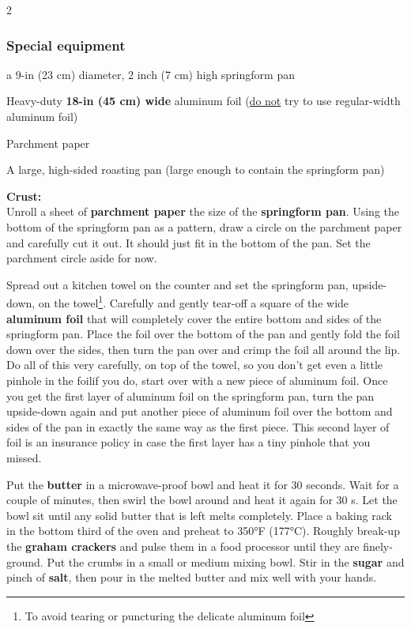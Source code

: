 \begin{multicols}{2}
	\subsubsection*{Special equipment}
\begin{ingredients}
	\item a 9-in (23 cm) diameter, 2 inch (7 cm) high springform pan
	\item Heavy-duty \textbf{18-in (45 cm) wide} aluminum foil (\underline{do not} try to use regular-width aluminum foil)
	\item Parchment paper
	\item A large, high-sided roasting pan (large enough to contain the springform pan)
\end{ingredients}
	
\end{multicols}

\medskip

\noindent \textbf{Crust:} \\ 
Unroll a sheet of \textbf{parchment paper} the size of the \textbf{springform pan}. 
Using the bottom of the springform pan as a pattern, draw a circle on the parchment paper and carefully cut it out. 
It should just fit in the bottom of the pan. 
Set the parchment circle aside for now.

Spread out a kitchen towel on the counter and set the springform pan, upside-down, on the towel\footnote{To avoid tearing or puncturing the delicate aluminum foil}.
Carefully and gently tear-off a square of the wide \textbf{aluminum foil} that will completely cover the entire bottom and sides of the springform pan. 
Place the foil over the bottom of the pan and gently fold the foil down over the sides, then turn the pan over and crimp the foil all around the lip. 
Do all of this very carefully, on top of the towel, so you don’t get even a little pinhole in the foil\textemdash if you do, start over with a new piece of aluminum foil. 
Once you get the first layer of aluminum foil on the springform pan, turn the pan upside-down again and put another piece of aluminum foil over the bottom and sides of the pan in exactly the same way as the first piece. 
This second layer of foil is an insurance policy in case the first layer has a tiny pinhole that you missed.

Put the \textbf{butter} in a microwave-proof bowl and heat it for 30 seconds. 
Wait for a couple of minutes, then swirl the bowl around and heat it again for 30 s. 
Let the bowl sit until any solid butter that is left melts completely.
Place a baking rack in the bottom third of the oven and preheat to 350°F (177°C). 
Roughly break-up the \textbf{graham crackers} and pulse them in a food processor until they are finely-ground. 
Put the crumbs in a small or medium mixing bowl. 
Stir in the \textbf{sugar} and pinch of \textbf{salt}, then pour in the melted butter and mix well with your hands.

